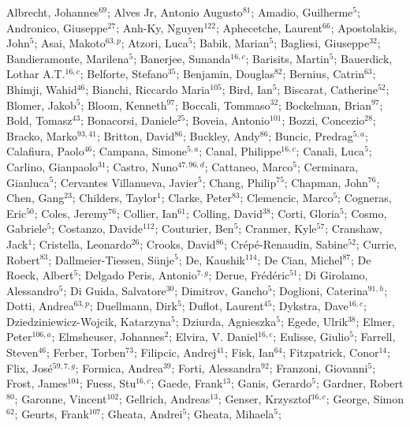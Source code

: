 Albrecht, Johannes$^{69}$;
Alves Jr, Antonio Augusto$^{81}$;
Amadio, Guilherme$^{5}$;
Andronico, Giuseppe$^{27}$;
Anh-Ky, Nguyen$^{122}$;
Aphecetche, Laurent$^{66}$;
Apostolakis, John$^{5}$;
Asai, Makoto$^{63,p}$;
Atzori, Luca$^{5}$;
Babik, Marian$^{5}$;
Bagliesi, Giuseppe$^{32}$;
Bandieramonte, Marilena$^{5}$;
Banerjee, Sunanda$^{16,c}$;
Barisits, Martin$^{5}$;
Bauerdick, Lothar A.T.$^{16,c}$;
Belforte, Stefano$^{35}$;
Benjamin, Douglas$^{82}$;
Bernius, Catrin$^{63}$;
Bhimji, Wahid$^{46}$;
Bianchi, Riccardo Maria$^{105}$;
Bird, Ian$^{5}$;
Biscarat, Catherine$^{52}$;
Blomer, Jakob$^{5}$;
Bloom, Kenneth$^{97}$;
Boccali, Tommaso$^{32}$;
Bockelman, Brian$^{97}$;
Bold, Tomasz$^{43}$;
Bonacorsi, Daniele$^{25}$;
Boveia, Antonio$^{101}$;
Bozzi, Concezio$^{28}$;
Bracko, Marko$^{93,41}$;
Britton, David$^{86}$;
Buckley, Andy$^{86}$;
Buncic, Predrag$^{5,a}$;
Calafiura, Paolo$^{46}$;
Campana, Simone$^{5,a}$;
Canal, Philippe$^{16,c}$;
Canali, Luca$^{5}$;
Carlino, Gianpaolo$^{31}$;
Castro, Nuno$^{47,96,d}$;
Cattaneo, Marco$^{5}$;
Cerminara, Gianluca$^{5}$;
Cervantes Villanueva, Javier$^{5}$;
Chang, Philip$^{75}$;
Chapman, John$^{76}$;
Chen, Gang$^{23}$;
Childers, Taylor$^{1}$;
Clarke, Peter$^{83}$;
Clemencic, Marco$^{5}$;
Cogneras, Eric$^{50}$;
Coles, Jeremy$^{76}$;
Collier, Ian$^{61}$;
Colling, David$^{38}$;
Corti, Gloria$^{5}$;
Cosmo, Gabriele$^{5}$;
Costanzo, Davide$^{112}$;
Couturier, Ben$^{5}$;
Cranmer, Kyle$^{57}$;
Cranshaw, Jack$^{1}$;
Cristella, Leonardo$^{26}$;
Crooks, David$^{86}$;
Crépé-Renaudin, Sabine$^{52}$;
Currie, Robert$^{83}$;
Dallmeier-Tiessen, Sünje$^{5}$;
De, Kaushik$^{114}$;
De Cian, Michel$^{87}$;
De Roeck, Albert$^{5}$;
Delgado Peris, Antonio$^{7,g}$;
Derue, Frédéric$^{51}$;
Di Girolamo, Alessandro$^{5}$;
Di Guida, Salvatore$^{30}$;
Dimitrov, Gancho$^{5}$;
Doglioni, Caterina$^{91,h}$;
Dotti, Andrea$^{63,p}$;
Duellmann, Dirk$^{5}$;
Duflot, Laurent$^{45}$;
Dykstra, Dave$^{16,c}$;
Dziedziniewicz-Wojcik, Katarzyna$^{5}$;
Dziurda, Agnieszka$^{5}$;
Egede, Ulrik$^{38}$;
Elmer, Peter$^{106,a}$;
Elmsheuser, Johannes$^{2}$;
Elvira, V. Daniel$^{16,c}$;
Eulisse, Giulio$^{5}$;
Farrell, Steven$^{46}$;
Ferber, Torben$^{73}$;
Filipcic, Andrej$^{41}$;
Fisk, Ian$^{64}$;
Fitzpatrick, Conor$^{14}$;
Flix, José$^{59,7,g}$;
Formica, Andrea$^{39}$;
Forti, Alessandra$^{92}$;
Franzoni, Giovanni$^{5}$;
Frost, James$^{104}$;
Fuess, Stu$^{16,c}$;
Gaede, Frank$^{13}$;
Ganis, Gerardo$^{5}$;
Gardner, Robert$^{80}$;
Garonne, Vincent$^{102}$;
Gellrich, Andreas$^{13}$;
Genser, Krzysztof$^{16,c}$;
George, Simon$^{62}$;
Geurts, Frank$^{107}$;
Gheata, Andrei$^{5}$;
Gheata, Mihaela$^{5}$;
